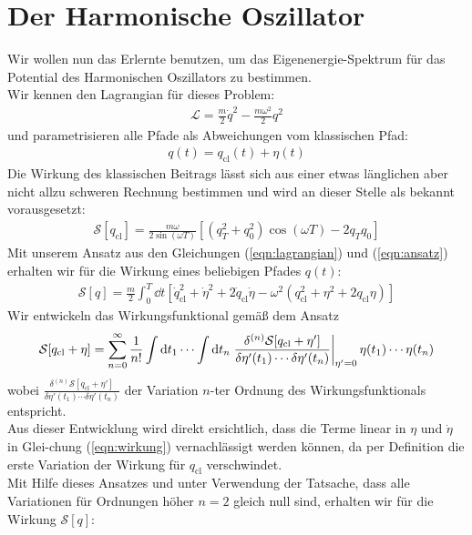 \section{Der Harmonische Oszillator}
Wir wollen nun das Erlernte benutzen, um das Eigenenergie-Spektrum für das  Potential des Harmonischen Oszillators zu bestimmen. \\
Wir kennen den Lagrangian für dieses Problem: 
\begin{align}
	\mathcal{L} = \frac{m}{2}\dot{q}^2 - \frac{m\omega^2}{2}q^2 \label{eqn:lagrangian}
\end{align}
und parametrisieren alle Pfade als Abweichungen vom klassischen Pfad:
\begin{align}
	q(t) = q_{\text{cl}}(t) + \eta(t) \label{eqn:ansatz}
\end{align}
Die Wirkung des klassischen Beitrags lässt sich aus einer etwas länglichen aber nicht allzu schweren Rechnung bestimmen und wird an dieser Stelle als bekannt vorausgesetzt:
\begin{align}
	\mathcal{S}[q_{\text{cl}}] = \frac{m\omega}{2\sin(\omega T)}\left[(q_T^2+q_0^2)\cos(\omega T)- 2q_Tq_0\right]
\end{align}
Mit unserem Ansatz aus den Gleichungen (\ref{eqn:lagrangian}) und (\ref{eqn:ansatz}) erhalten wir für die Wirkung eines beliebigen Pfades $q(t)$:
\begin{align}
	\mathcal{S}[q] = \frac{m}{2} \int_0^T \dd t \left[\dot{q}_{\text{cl}}^2 + \dot{\eta}^2 + 2\dot{q}_{\text{cl}}\dot{\eta} - \omega^2\left(q_{\text{cl}}^2 + \eta^2 + 2q_{\text{cl}}\eta \right) \right] \label{eqn:wirkung}
\end{align}
Wir entwickeln das Wirkungsfunktional gemäß dem Ansatz
\begin{align}
	\mathcal{S}[q_{\text{cl}} + \eta] = \sum_{n=0}^{\infty} \frac{1}{n!} \int \dd t_1 \cdots \int \dd t_n \eval{\frac{\delta^{(n)}\mathcal{S}[q_{\text{cl}} + \eta']}{\delta\eta'(t_1)\cdots\delta\eta'(t_n)}}_{\eta' = 0} \eta(t_1)\cdots\eta(t_n)
\end{align}
wobei $\frac{\delta^{(n)}\mathcal{S}[q_{\text{cl}} + \eta']}{\delta\eta'(t_1)\cdots\delta\eta'(t_n)}$ der Variation $n$-ter Ordnung des Wirkungsfunktionals entspricht. \\
Aus dieser Entwicklung wird direkt ersichtlich, dass die Terme linear in $\eta$ und $\dot{\eta}$ in Glei-chung (\ref{eqn:wirkung}) vernachlässigt werden können, da per Definition die erste Variation der Wirkung für $q_{\text{cl}}$ verschwindet. \\
Mit Hilfe dieses Ansatzes und unter Verwendung der Tatsache, dass alle Variationen für Ordnungen höher $n=2$ gleich null sind, erhalten wir für die Wirkung $\mathcal{S}[q]$:
